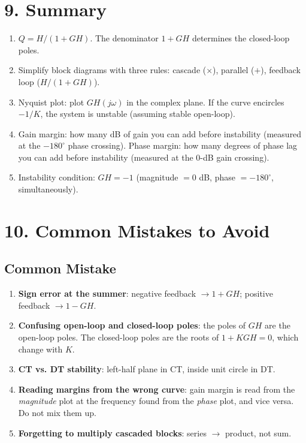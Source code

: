 \documentclass[11pt]{article}
\begin{document}
\section*{9. Summary}

\begin{enumerate}
  \item $Q = H/(1 + GH)$. The denominator $1 + GH$ determines the closed-loop poles.
  \item Simplify block diagrams with three rules: cascade ($\times$), parallel ($+$), feedback loop ($H/(1 + GH)$).
  \item Nyquist plot: plot $GH(j\omega)$ in the complex plane. If the curve encircles $-1/K$, the system is unstable (assuming stable open-loop).
  \item Gain margin: how many dB of gain you can add before instability (measured at the $-180^\circ$ phase crossing). Phase margin: how many degrees of phase lag you can add before instability (measured at the 0-dB gain crossing).
  \item Instability condition: $GH = -1$ (magnitude $= 0$ dB, phase $= -180^\circ$, simultaneously).
\end{enumerate}

\section*{10. Common Mistakes to Avoid}

\subsection*{Common Mistake}
\begin{enumerate}
  \item \textbf{Sign error at the summer}: negative feedback $\to 1 + GH$; positive feedback $\to 1 - GH$.
  \item \textbf{Confusing open-loop and closed-loop poles}: the poles of $GH$ are the open-loop poles. The closed-loop poles are the roots of $1 + KGH = 0$, which change with $K$.
  \item \textbf{CT vs. DT stability}: left-half plane in CT, inside unit circle in DT.
  \item \textbf{Reading margins from the wrong curve}: gain margin is read from the \textit{magnitude} plot at the frequency found from the \textit{phase} plot, and vice versa. Do not mix them up.
  \item \textbf{Forgetting to multiply cascaded blocks}: series $\to$ product, not sum.
\end{enumerate}
\end{document}
